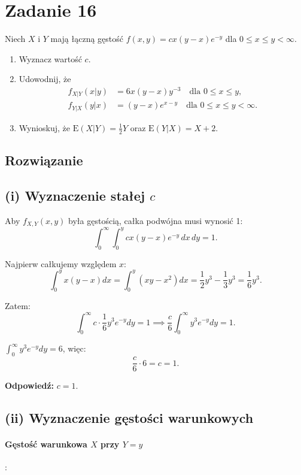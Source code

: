 \section{Zadanie 16}
Niech \(X\) i \(Y\) mają łączną gęstość \(f(x, y) = cx(y - x)e^{-y}\) dla \(0 \le x \le y < \infty\).

\begin{enumerate}
	\item Wyznacz wartość \(c\).
	\item Udowodnij, że
	      \begin{align*}
		      f_{X|Y}(x | y) & = 6x(y - x)y^{-3} \quad \text{dla } 0 \le x \le y,           \\
		      f_{Y|X}(y | x) & = (y - x)e^{x - y} \quad \text{dla } 0 \le x \le y < \infty.
	      \end{align*}
	\item Wynioskuj, że \(\text{E}(X | Y) = \frac{1}{2}Y\) oraz \(\text{E}(Y | X) = X + 2\).
\end{enumerate}

\subsection*{Rozwiązanie}
\subsection*{(i) Wyznaczenie stałej \(c\)}

Aby \(f_{X,Y}(x,y)\) była gęstością, całka podwójna musi wynosić 1:
\[
	\int_0^\infty \int_0^y c x (y-x) e^{-y} \, dx \, dy = 1.
\]

Najpierw całkujemy względem \(x\):
\[
	\int_0^y x(y-x) dx = \int_0^y (xy - x^2) dx = \frac{1}{2}y^3 - \frac{1}{3}y^3 = \frac{1}{6}y^3.
\]

Zatem:
\[
	\int_0^\infty c \cdot \frac{1}{6} y^3 e^{-y} dy = 1 \implies \frac{c}{6} \int_0^\infty y^3 e^{-y} dy = 1.
\]

\(\int_0^\infty y^3 e^{-y} dy = 6\), więc:
\[
	\frac{c}{6} \cdot 6 = c = 1.
\]

\textbf{Odpowiedź:} \(c = 1\).

\subsection*{(ii) Wyznaczenie gęstości warunkowych}

\paragraph{Gęstość warunkowa \(X\) przy \(Y=y\)}:

